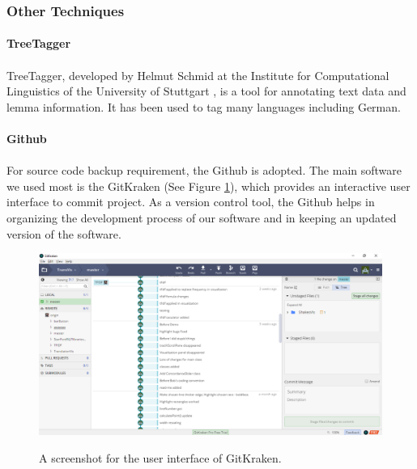 \subsubsection{Other Techniques}

\paragraph{TreeTagger}
\paragraph[]{}TreeTagger, developed by Helmut Schmid at the Institute for Computational Linguistics of the University of Stuttgart \cite{TreeTagger}, is a tool for annotating text data and lemma information. It has been used to tag many languages including German.

\paragraph{Github}
\paragraph[]{} For source code backup requirement, the Github is adopted. The main software we used most is the GitKraken (See Figure \ref{fig:gitKraken}), which provides an interactive user interface to commit project. As a version control tool, the Github helps in organizing the development process of our software and in keeping an updated version of the software.

\begin{figure}[H]
	\centering    
	\includegraphics[scale=0.4]{Figs/GitKraken}\\[1ex]
	\caption{A screenshot for the user interface of GitKraken.}
	\label{fig:gitKraken}
\end{figure}

